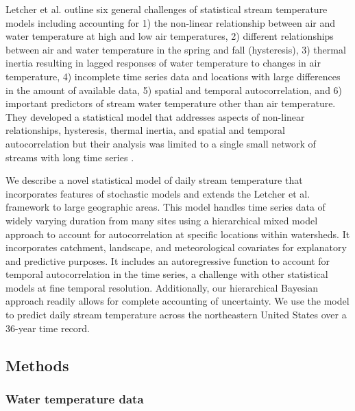 \documentclass[]{article}
\begin{document}
Letcher et al. \citeyearpar{Letcher2016t} outline six general challenges
of statistical stream temperature models including accounting for 1) the
non-linear relationship between air and water temperature at high and
low air temperatures, 2) different relationships between air and water
temperature in the spring and fall (hysteresis), 3) thermal inertia
resulting in lagged responses of water temperature to changes in air
temperature, 4) incomplete time series data and locations with large
differences in the amount of available data, 5) spatial and temporal
autocorrelation, and 6) important predictors of stream water temperature
other than air temperature. They developed a statistical model that
addresses aspects of non-linear relationships, hysteresis, thermal
inertia, and spatial and temporal autocorrelation but their analysis was
limited to a single small network of streams with long time series
\citep{Letcher2016t}.

We describe a novel statistical model of daily stream temperature that
incorporates features of stochastic models and extends the Letcher et
al. \citeyearpar{Letcher2016t} framework to large geographic areas. This
model handles time series data of widely varying duration from many
sites using a hierarchical mixed model approach to account for
autocorrelation at specific locations within watersheds. It incorporates
catchment, landscape, and meteorological covariates for explanatory and
predictive purposes. It includes an autoregressive function to account
for temporal autocorrelation in the time series, a challenge with other
statistical models at fine temporal resolution. Additionally, our
hierarchical Bayesian approach readily allows for complete accounting of
uncertainty. We use the model to predict daily stream temperature across
the northeastern United States over a 36-year time record.

\subsection{Methods}\label{methods}

\subsubsection{Water temperature data}\label{water-temperature-data}
\end{document}
